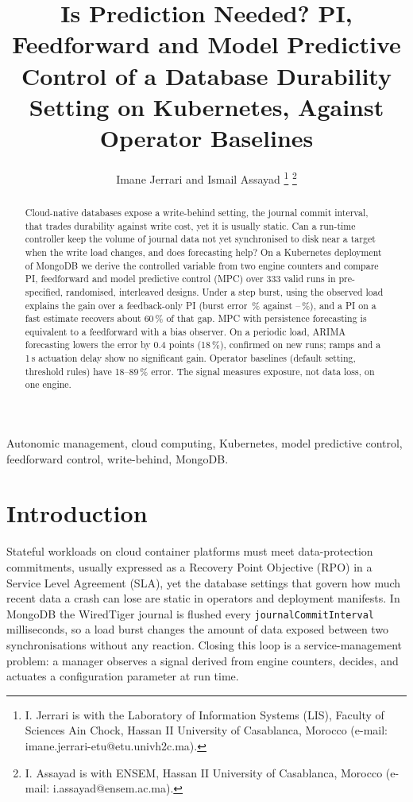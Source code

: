 \documentclass[journal]{IEEEtran}
\begin{document}
\title{Is Prediction Needed? PI, Feedforward and Model Predictive Control of a Database Durability Setting on Kubernetes, Against Operator Baselines}
\author{Imane Jerrari and Ismail Assayad%
\thanks{I. Jerrari is with the Laboratory of Information Systems (LIS), Faculty of Sciences Ain Chock, Hassan II University of Casablanca, Morocco (e-mail: imane.jerrari-etu@etu.univh2c.ma).}%
\thanks{I. Assayad is with ENSEM, Hassan II University of Casablanca, Morocco (e-mail: i.assayad@ensem.ac.ma).}}
\maketitle
\begin{abstract}
Cloud-native databases expose a write-behind setting, the journal commit interval, that trades durability against write cost, yet it is usually static. Can a run-time controller keep the volume of journal data not yet synchronised to disk near a target when the write load changes, and does forecasting help? On a Kubernetes deployment of MongoDB we derive the controlled variable from two engine counters and compare PI, feedforward and model predictive control (MPC) over 333 valid runs in pre-specified, randomised, interleaved designs. Under a step burst, using the observed load explains the gain over a feedback-only PI (burst error \MaePITS\,\% against \MaePIFFS--\MaeMPCMS\,\%), and a PI on a fast estimate recovers about 60\,\% of that gap. MPC with persistence forecasting is equivalent to a feedforward with a bias observer. On a periodic load, ARIMA forecasting lowers the error by 0.4 points (18\,\%), confirmed on new runs; ramps and a 1\,s actuation delay show no significant gain. Operator baselines (default setting, threshold rules) have 18--89\,\% error. The signal measures exposure, not data loss, on one engine.
\end{abstract}
\begin{IEEEkeywords}
Autonomic management, cloud computing, Kubernetes, model predictive control, feedforward control, write-behind, MongoDB.
\end{IEEEkeywords}
\section{Introduction}\label{sec:intro}
Stateful workloads on cloud container platforms must meet data-protection commitments, usually expressed as a Recovery Point Objective (RPO) in a Service Level Agreement (SLA), yet the database settings that govern how much recent data a crash can lose are static in operators and deployment manifests. In MongoDB the WiredTiger journal is flushed every \texttt{journalCommitInterval} milliseconds, so a load burst changes the amount of data exposed between two synchronisations without any reaction. Closing this loop is a service-management problem: a manager observes a signal derived from engine counters, decides, and actuates a configuration parameter at run time.
\end{document}
